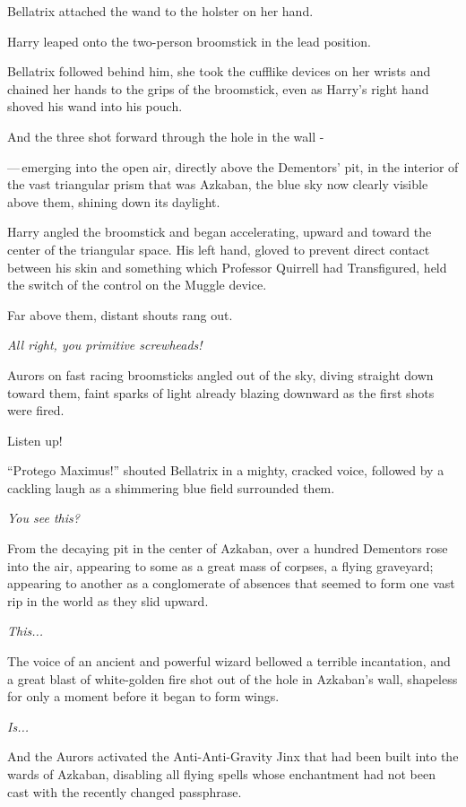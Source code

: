Bellatrix attached the wand to the holster on her hand.

Harry leaped onto the two-person broomstick in the lead position.

Bellatrix followed behind him, she took the cufflike devices on her wrists and chained her hands to the grips of the broomstick, even as Harry's right hand shoved his wand into his pouch.

And the three shot forward through the hole in the wall -

---\,emerging into the open air, directly above the Dementors' pit, in the interior of the vast triangular prism that was Azkaban, the blue sky now clearly visible above them, shining down its daylight.

Harry angled the broomstick and began accelerating, upward and toward the center of the triangular space. His left hand, gloved to prevent direct contact between his skin and something which Professor Quirrell had Transfigured, held the switch of the control on the Muggle device.

Far above them, distant shouts rang out.

\emph{All right, you primitive screwheads!}

Aurors on fast racing broomsticks angled out of the sky, diving straight down toward them, faint sparks of light already blazing downward as the first shots were fired.

Listen up!

``Protego Maximus!'' shouted Bellatrix in a mighty, cracked voice, followed by a cackling laugh as a shimmering blue field surrounded them.

\emph{You see this?}

From the decaying pit in the center of Azkaban, over a hundred Dementors rose into the air, appearing to some as a great mass of corpses, a flying graveyard; appearing to another as a conglomerate of absences that seemed to form one vast rip in the world as they slid upward.

\emph{This...}

The voice of an ancient and powerful wizard bellowed a terrible incantation, and a great blast of white-golden fire shot out of the hole in Azkaban's wall, shapeless for only a moment before it began to form wings.

\emph{Is...}

And the Aurors activated the Anti-Anti-Gravity Jinx that had been built into the wards of Azkaban, disabling all flying spells whose enchantment had not been cast with the recently changed passphrase.

